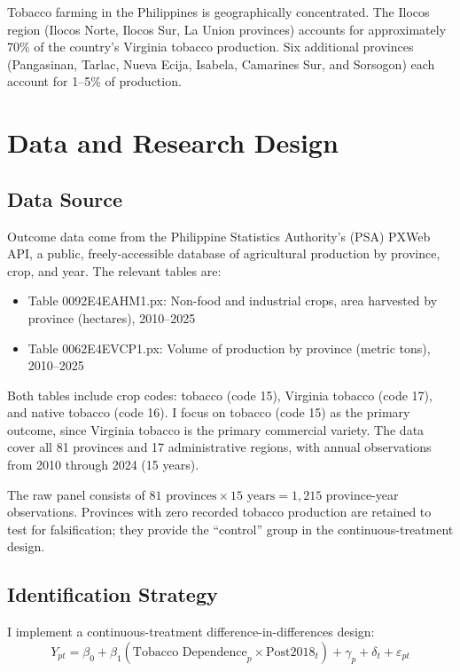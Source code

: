 \documentclass[12pt]{article}
\begin{document}
Tobacco farming in the Philippines is geographically concentrated. The Ilocos region (Ilocos Norte, Ilocos Sur, La Union provinces) accounts for approximately 70\% of the country's Virginia tobacco production. Six additional provinces (Pangasinan, Tarlac, Nueva Ecija, Isabela, Camarines Sur, and Sorsogon) each account for 1--5\% of production.

\section{Data and Research Design}

\subsection{Data Source}

Outcome data come from the Philippine Statistics Authority's (PSA) PXWeb API, a public, freely-accessible database of agricultural production by province, crop, and year. The relevant tables are:
\begin{itemize}
\item Table 0092E4EAHM1.px: Non-food and industrial crops, area harvested by province (hectares), 2010--2025
\item Table 0062E4EVCP1.px: Volume of production by province (metric tons), 2010--2025
\end{itemize}

Both tables include crop codes: tobacco (code 15), Virginia tobacco (code 17), and native tobacco (code 16). I focus on tobacco (code 15) as the primary outcome, since Virginia tobacco is the primary commercial variety. The data cover all 81 provinces and 17 administrative regions, with annual observations from 2010 through 2024 (15 years).

The raw panel consists of $81 \text{ provinces} \times 15 \text{ years} = 1,215$ province-year observations. Provinces with zero recorded tobacco production are retained to test for falsification; they provide the ``control'' group in the continuous-treatment design.

\subsection{Identification Strategy}

I implement a continuous-treatment difference-in-differences design:
\begin{equation}
Y_{pt} = \beta_0 + \beta_1 (\text{Tobacco Dependence}_p \times \text{Post2018}_t) + \gamma_p + \delta_t + \varepsilon_{pt}
\end{equation}
\end{document}

